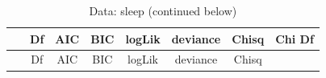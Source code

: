 \documentclass[
]{article}
\begin{document}
\begin{longtable}[]{@{}cccccccc@{}}
\caption{Data: sleep (continued below)}\tabularnewline
\toprule
\begin{minipage}[b]{0.22\columnwidth}\centering
~\strut
\end{minipage} & \begin{minipage}[b]{0.05\columnwidth}\centering
Df\strut
\end{minipage} & \begin{minipage}[b]{0.07\columnwidth}\centering
AIC\strut
\end{minipage} & \begin{minipage}[b]{0.07\columnwidth}\centering
BIC\strut
\end{minipage} & \begin{minipage}[b]{0.09\columnwidth}\centering
logLik\strut
\end{minipage} & \begin{minipage}[b]{0.11\columnwidth}\centering
deviance\strut
\end{minipage} & \begin{minipage}[b]{0.08\columnwidth}\centering
Chisq\strut
\end{minipage} & \begin{minipage}[b]{0.09\columnwidth}\centering
Chi Df\strut
\end{minipage}\tabularnewline
\midrule
\endfirsthead
\toprule
\begin{minipage}[b]{0.22\columnwidth}\centering
~\strut
\end{minipage} & \begin{minipage}[b]{0.05\columnwidth}\centering
Df\strut
\end{minipage} & \begin{minipage}[b]{0.07\columnwidth}\centering
AIC\strut
\end{minipage} & \begin{minipage}[b]{0.07\columnwidth}\centering
BIC\strut
\end{minipage} & \begin{minipage}[b]{0.09\columnwidth}\centering
logLik\strut
\end{minipage} & \begin{minipage}[b]{0.11\columnwidth}\centering
deviance\strut
\end{minipage} & \begin{minipage}[b]{0.08\columnwidth}\centering
Chisq\strut
\end{minipage} & \begin{minipage}[b]{0.09\columnwidth}\centering

\end{minipage}
\end{longtable}
\end{document}
